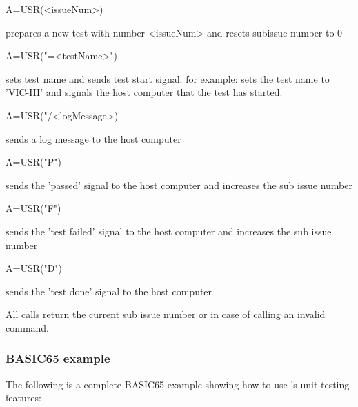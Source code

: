 \begin{screenoutput}
    A=USR(<issueNum>)
\end{screenoutput}
prepares a new test with number <issueNum> and resets subissue number to 0

\begin{screenoutput}
    A=USR("=<testName>")
\end{screenoutput}
sets test name and sends test start signal; for example:  
sets the test name to 'VIC-III' and signals the host computer that the test 
has started.

\begin{screenoutput}
    A=USR("/<logMessage>)
\end{screenoutput}
sends a log message to the host computer

\begin{screenoutput}
    A=USR("P")
\end{screenoutput}
sends the 'passed' signal to the host computer and increases the sub issue number

\begin{screenoutput}
    A=USR("F")
\end{screenoutput}
sends the 'test failed' signal to the host computer and increases 
the sub issue number

\begin{screenoutput}
    A=USR("D")
\end{screenoutput}
sends the 'test done' signal to the host computer 

All calls return the current sub issue number or  in 
case of calling an invalid command.

\subsubsection{BASIC65 example}

The following is a complete BASIC65 example showing how to use 's 
unit testing features:

